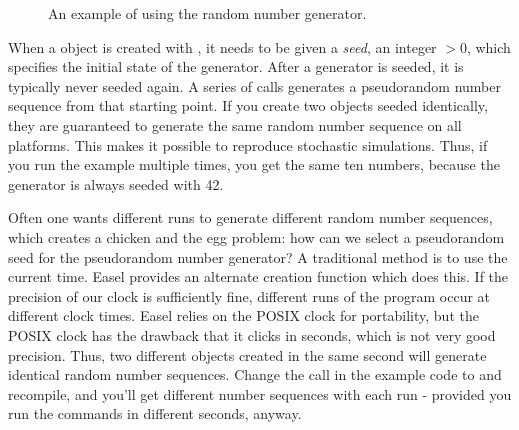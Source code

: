 \begin{figure}

\caption{An example of using the random number generator.}
\label{fig:random_example}
\end{figure}

When a  object is created with
, it needs to be given a \emph{seed},
an integer $> 0$, which specifies the initial state of the
generator. After a generator is seeded, it is typically never seeded
again. A series of  calls generates a
pseudorandom number sequence from that starting point. If you create
two  objects seeded identically, they are
guaranteed to generate the same random number sequence on all
platforms. This makes it possible to reproduce stochastic simulations.
Thus, if you run the example multiple times, you get the same ten
numbers, because the generator is always seeded with 42.

Often one wants different runs to generate different random number
sequences, which creates a chicken and the egg problem: how can we
select a pseudorandom seed for the pseudorandom number generator? A
traditional method is to use the current time. Easel provides an
alternate creation function
 which does this. If the
precision of our clock is sufficiently fine, different runs of the
program occur at different clock times. Easel relies on the POSIX
clock for portability, but the POSIX clock has the drawback that it
clicks in seconds, which is not very good precision. Thus, two
different  objects created in the same second
will generate identical random number sequences. Change the
 call in the example code to
 and recompile, and you'll
get different number sequences with each run - provided you run the
commands in different seconds, anyway. 

